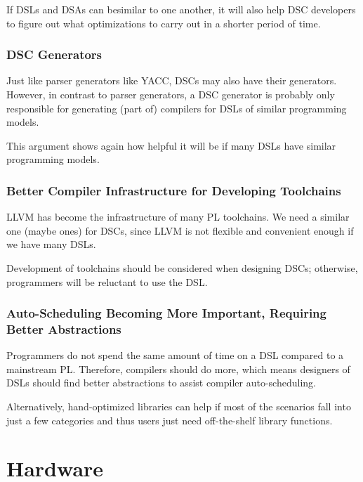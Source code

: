 \documentclass[11pt]{article}
\begin{document}
If DSLs and DSAs can besimilar to one another, it will also help DSC developers to figure out what optimizations to carry out in a shorter period of time.
\subsubsection*{DSC Generators}
Just like parser generators like YACC, DSCs may also have their generators.
However, in contrast to parser generators, a DSC generator is probably only responsible for generating (part of) compilers for DSLs of similar programming models.

This argument shows again how helpful it will be if many DSLs have similar programming models.
\subsubsection*{Better Compiler Infrastructure for Developing Toolchains}
LLVM has become the infrastructure of many PL toolchains.
We need a similar one (maybe ones) for DSCs, since LLVM is not flexible and convenient enough if we have many DSLs.

Development of toolchains should be considered when designing DSCs; otherwise, programmers will be reluctant to use the DSL.

\subsubsection*{Auto-Scheduling Becoming More Important, Requiring Better Abstractions}
Programmers do not spend the same amount of time on a DSL compared to a mainstream PL.
Therefore, compilers should do more, which means designers of DSLs should find better abstractions to assist compiler auto-scheduling.

Alternatively, hand-optimized libraries can help if most of the scenarios fall into just a few categories and thus users just need off-the-shelf library functions.
\section{Hardware}
\end{document}
